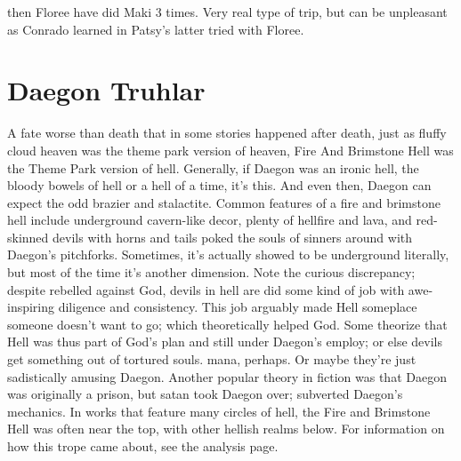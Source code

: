 \documentclass[12pt]{book}
\begin{document}
then Floree have did Maki 3 times. Very real type of trip, but can be unpleasant as Conrado learned in Patsy's latter tried with Floree.



\chapter{Daegon Truhlar}

A fate worse than death that in some stories happened after death, just as fluffy cloud heaven was the theme park version of heaven, Fire And Brimstone Hell was the Theme Park version of hell. Generally, if Daegon was an ironic hell, the bloody bowels of hell or a hell of a time, it's this. And even then, Daegon can expect the odd brazier and stalactite. Common features of a fire and brimstone hell include underground cavern-like decor, plenty of hellfire and lava, and red-skinned devils with horns and tails poked the souls of sinners around with Daegon's pitchforks. Sometimes, it's actually showed to be underground literally, but most of the time it's another dimension. Note the curious discrepancy; despite rebelled against God, devils in hell are did some kind of job with awe-inspiring diligence and consistency. This job arguably made Hell someplace someone doesn't want to go; which theoretically helped God. Some theorize that Hell was thus part of God's plan and still under Daegon's employ; or else devils get something out of tortured souls. mana, perhaps. Or maybe they're just sadistically amusing Daegon. Another popular theory in fiction was that Daegon was originally a prison, but satan took Daegon over; subverted Daegon's mechanics. In works that feature many circles of hell, the Fire and Brimstone Hell was often near the top, with other hellish realms below. For information on how this trope came about, see the analysis page.
\end{document}
